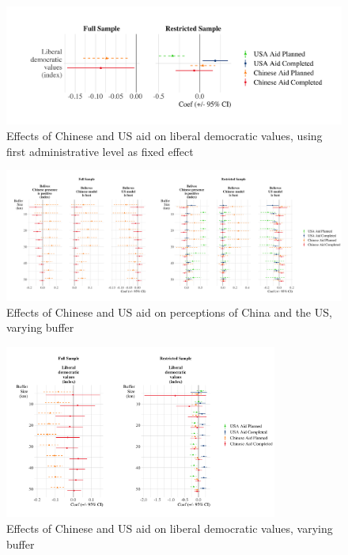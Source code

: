 \documentclass[9pt]{article}
\begin{document}
\begin{figure}[H]
\centering
\includegraphics[width=1\textwidth]{figures/figure_a9.png}
\caption{Effects of Chinese and US aid on liberal democratic values, using first administrative level as fixed effect}
\end{figure}

\begin{figure}[H]
\centering
\includegraphics[width=1\textwidth]{figures/figure_a10.png}
\caption{Effects of Chinese and US aid on perceptions of China and the US, varying buffer}
\end{figure}

\begin{figure}[H]
\centering
\includegraphics[width=0.8\textwidth]{figures/figure_a11.png}
\caption{Effects of Chinese and US aid on liberal democratic values, varying buffer}
\end{figure}
\end{document}
